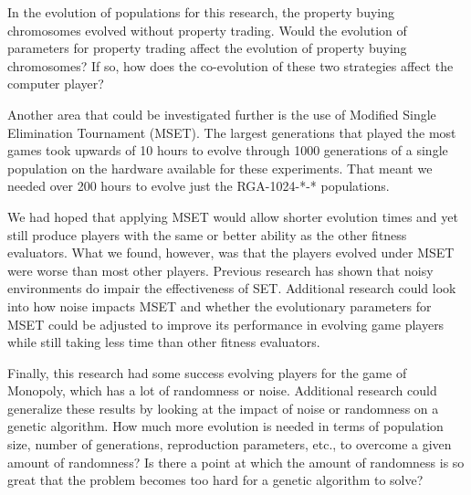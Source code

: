 In the evolution of populations for this research, the property buying
chromosomes evolved without property trading. Would the evolution of parameters
for property trading affect the evolution of property buying chromosomes? If so,
how does the co-evolution of these two strategies affect the computer player?

Another area that could be investigated further is the use of Modified Single
Elimination Tournament (MSET). The largest generations that played the most
games took upwards of 10 hours to evolve through 1000 generations of a single
population on the hardware available for these experiments. That meant we needed
over 200 hours to evolve just the RGA-1024-*-* populations.

We had hoped that applying MSET would allow shorter evolution times and yet
still produce players with the same or better ability as the other fitness
evaluators. What we found, however, was that the players evolved under MSET were
worse than most other players. Previous research has shown that noisy
environments do impair the effectiveness of SET. Additional research could look
into how noise impacts MSET and whether the evolutionary parameters for MSET
could be adjusted to improve its performance in evolving game players while
still taking less time than other fitness evaluators.

Finally, this research had some success evolving players for the game of
Monopoly, which has a lot of randomness or noise. Additional research could
generalize these results by looking at the impact of noise or randomness on a
genetic algorithm. How much more evolution is needed in terms of population
size, number of generations, reproduction parameters, etc., to overcome a given
amount of randomness? Is there a point at which the amount of randomness is so
great that the problem becomes too hard for a genetic algorithm to solve?






